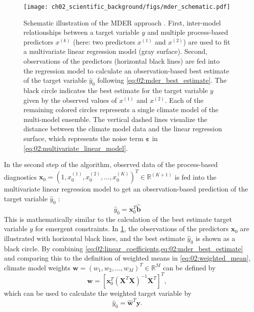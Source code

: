 \begin{figure}[t]
  \centering
  \texttt{[image: 
    ch02\_scientific\_background/figs/mder\_schematic.pdf]}
  \caption[
    Schematic illustration of the \acf{MDER} approach.
  ]{
    Schematic illustration of the \acf{MDER} approach \autocite{Karpechko2013}.
    First, inter-model relationships between a target variable $y$ and multiple
    process-based predictors $x^{(k)}$ (here: two predictors $x^{(1)}$ and
    $x^{(2)}$) are used to fit a multivariate linear regression model (gray
    surface). Second, observations of the predictors (horizontal black lines)
    are fed into the regression model to calculate an observation-based best
    estimate of the target variable $\hat{y}_0$ following
    \cref{eq:02:mder_best_estimate}. The black circle indicates the best
    estimate for the target variable $y$ given by the observed values of
    $x^{(1)}$ and $x^{(2)}$. Each of the remaining colored circles represents a
    single climate model of the multi-model ensemble. The vertical dashed lines
    visualize the distance between the climate model data and the linear
    regression surface, which represents the noise term $\bm{\varepsilon}$ in
    \cref{eq:02:multivariate_linear_model}.
  }
  \label{fig:02:mder}
\end{figure}

In the second step of the algorithm, observed data of the process-based
diagnostics $\bm{x}_0 = \left( 1, x_0^{(1)}, x_0^{(2)}, \ldots, x_0^{(K)}
\right)^T \in \mathbb{R}^{(K + 1)}$ is fed into the multivariate linear
regression model to get an observation-based prediction of the target variable
$\hat{y}_0$
\autocite{Karpechko2013}:
\begin{equation}
  \hat{y}_0 = \bm{x}_0^T \hat{\bm{b}}
  \label{eq:02:mder_best_estimate}
\end{equation}
This is mathematically similar to the calculation of the best estimate target
variable $y$ for emergent constraints. In \cref{fig:02:mder}, the observations
of the predictors $\bm{x}_0$ are illustrated with horizontal black lines, and
the best estimate $\hat{y}_0$ is shown as a black circle. By combining
\cref{eq:02:linear_coefficients,eq:02:mder_best_estimate} and comparing this to
the definition of weighted means in \cref{eq:02:weighted_mean}, climate model
weights $\bm{w} = \left( w_1, w_2, \ldots, w_M \right)^T \in \mathbb{R}^M$ can
be defined by
\begin{equation}
  \bm{w} = \left[ \bm{x}_0^T \left( \bm{X}^T \bm{X} \right)^{-1} \bm{X}^T
  \right]^T,
  \label{eq:02:mder_weights}
\end{equation}
which can be used to calculate the weighted target variable by
\begin{equation}
  \hat{y}_0 = \hat{\bm{w}}^T \bm{y}.
  \label{eq:02:weighted_mean_vector}
\end{equation}

